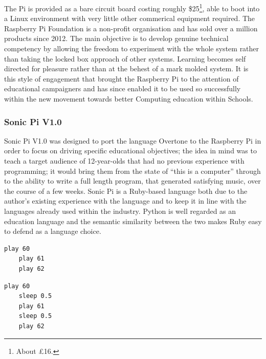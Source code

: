 \documentclass[11pt, abstracton, twoside, titlepage=true]{scrartcl}
\begin{document}
The Pi is provided as a bare circuit board costing roughly \$25\footnote{About 
\pounds16.}, able to boot 
into a Linux environment with very little other commerical equipment required. 
The Raspberry Pi Foundation is a non-profit organisation and has sold over a 
million products since 2012. The main objective is to develop genuine 
technical competency by allowing the freedom to experiment with the whole 
system rather than taking the locked box approach of other systems. Learning 
becomes self directed for pleasure rather than at the behest of a mark molded 
system. It is this style of engagement that brought the Raspberry Pi to the 
attention of educational campaigners and has since enabled it to be used so 
successfully within the new movement towards better Computing education within 
Schools. 

\subsubsection{Sonic Pi V1.0}

\begin{multicols}{2}
Sonic Pi V1.0 was designed to port the language Overtone to the Raspberry Pi in 
order to focus on driving specific educational objectives; the idea in mind was 
to teach a target audience of 12-year-olds that had no previous experience with 
programming; it would bring them from the state of ``this is a computer'' through 
to the ability to write a full length program, that generated satisfying music, 
over the course of a few weeks. Sonic Pi is a Ruby-based language both due to 
the author's existing experience with the language and to keep it in line with 
the languages already used within the industry. Python is well regarded as an 
education language and the semantic similarity between the two makes Ruby easy 
to defend as a language choice.
\\

\begin{minipage}{0.5\textwidth}
	\begin{minipage}[t]{\textwidth}
		\begin{lstlisting}[style = sonicpi]
	play 60
	play 61
	play 62
		\end{lstlisting}
	\end{minipage}

	\begin{minipage}[t]{\textwidth}
		\begin{lstlisting}[style = sonicpi]
	play 60
	sleep 0.5
	play 61
	sleep 0.5
	play 62
		\end{lstlisting}
	\end{minipage}
\end{minipage}

\end{multicols}
\end{document}
